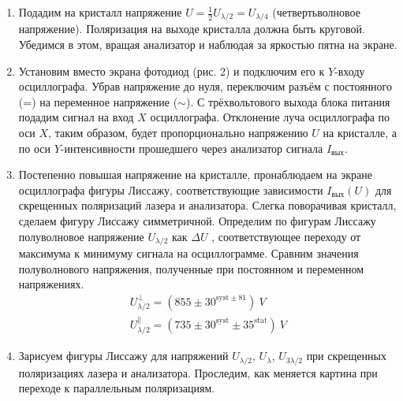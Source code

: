 \begin{enumerate}
    \item
    Подадим на кристалл напряжение $U = \frac{1}{2}U_{\lambda/2} = U_{\lambda/4}$ (четвертьволновое напряжение). Поляризация на выходе кристалла должна быть круговой. Убедимся в этом, вращая анализатор и наблюдая за яркостью пятна на экране.
    
    \item
    Установим вместо экрана фотодиод (рис. 2) и подключим его к $Y$-входу осциллографа. Убрав напряжение до нуля, переключим разъём с постоянного (=) на переменное напряжение ($\sim$). С трёхвольтового выхода блока питания подадим сигнал на вход $X$ осциллографа. Отклонение луча осциллографа по оси $X$, таким образом, будет пропорционально напряжению $U$ на кристалле, а по оси $Y$-интенсивности прошедшего через анализатор сигнала $I_{\text{вых}}$.
    
    \item 
    Постепенно повышая напряжение на кристалле, пронаблюдаем на экране осциллографа фигуры Лиссажу, соответствующие зависимости $I_{\text{вых}}(U)$ для скрещенных поляризаций лазера и анализатора. Слегка поворачивая кристалл, сделаем фигуру Лиссажу симметричной. Определим по фигурам Лиссажу полуволновое напряжение $U_{\lambda/2}$ как $\Delta U$ , соответствующее переходу от максимума к минимуму сигнала на осциллограмме. Сравним значения полуволнового напряжения, полученные при постоянном и переменном напряжениях.
    \begin{gather*}
    U_{\lambda/2}^{\perp} = (855 \pm 30^{\text{syst} \pm 81})~V\\
    U_{\lambda/2}^{\parallel} = (735 \pm 30^{\text{syst}}\pm 35^{\text{stat}})~V
    \end{gather*}
    
    \item
    Зарисуем фигуры Лиссажу для напряжений $U_{\lambda/2}$, $U_{\lambda}$, $U_{3\lambda/2}$ при скрещенных поляризациях лазера и анализатора. Проследим, как меняется картина при переходе к параллельным поляризациям.

\end{enumerate}




